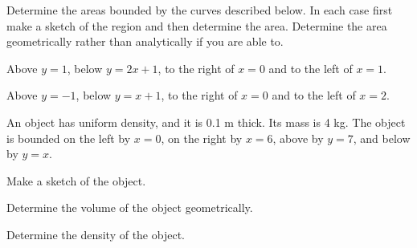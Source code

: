 \begin{problem}
\item Determine the areas bounded by the curves described below. In
  each case first make a sketch of the region and then determine the
  area. Determine the area geometrically rather than analytically if
  you are able to.
  \begin{subproblem}
  \item Above $y=1$, below $y=2x+1$, to the right of $x=0$ and to the
    left of $x=1$.
    \vfill
  \item Above $y=-1$, below $y=x+1$, to the right of $x=0$ and to the
    left of $x=2$.
    \vfill
  \end{subproblem}

\clearpage

\item An object has uniform density, and it is 0.1 m thick. Its mass
  is 4 kg. The object is bounded on the left by $x=0$, on the right by
  $x=6$, above by $y=7$, and below by $y=x$.
  \begin{subproblem}
    \item Make a sketch of the object.
      \vfill
    \item Determine the volume of the object geometrically.
      \vfill
    \item Determine the density of the object.
      \vfill
  \end{subproblem}


\end{problem}


